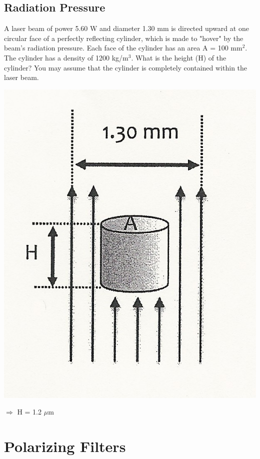 \documentclass[11pt]{article}
\begin{document}
\pagebreak
\subsection{Radiation Pressure}
A laser beam of power 5.60 W and diameter 1.30 mm is directed upward at one circular face of a perfectly reflecting cylinder, which is made to "hover" by the beam's radiation pressure.  Each face of the cylinder has an area A = 100 mm$^2$.  The cylinder has a density of 1200 kg/m$^3$.  What is the height (H) of the cylinder?  You may assume that the cylinder is completely contained within the laser beam.

\begin{center}
\includegraphics[scale=0.2]{Images/radiation_pressure.jpg}
\end{center}

$\Rightarrow$ H = 1.2 $\mu$m


\pagebreak
\section{Polarizing Filters}
\vspace{10pt}
\end{document}
